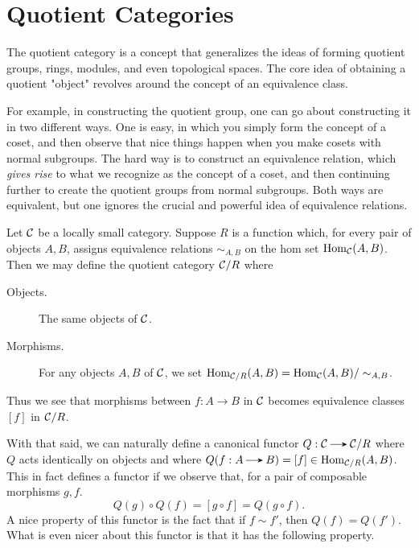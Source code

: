     \newpage
    \section{Quotient Categories}
    The quotient category is a concept that generalizes the ideas of
    forming quotient groups, rings, modules, and even topological
    spaces. The core idea of obtaining a quotient "object" revolves
    around the concept of an equivalence class. 

    For example, in constructing the quotient group, one can go about
    constructing it in two different ways. One is easy, in which you
    simply form the concept of a coset, and then observe that nice
    things happen when you make cosets with normal subgroups. The hard
    way is to construct an equivalence relation, which \textit{gives
    rise} to what we recognize as the concept of a coset, and then
    continuing further to create the quotient groups from normal
    subgroups. Both ways are equivalent, but one ignores the crucial
    and powerful idea of equivalence relations. 

    \begin{definition}
        Let $\mathcal{C}$ be a locally small category. Suppose $R$ is a function which, for every  
        pair of objects $A, B$, assigns equivalence 
        relations $\sim_{A, B}$ on the hom set $\operatorname{\mathrm{Hom}}_{\mathcal{C}}(A, B)$. Then we may define the 
        quotient category $\mathcal{C}/R$ where 
        \begin{description}
            \item[Objects.] The same objects of $\mathcal{C}$.
            \item[Morphisms.] For any objects $A,B$ of $\mathcal{C}$, we 
            set $\operatorname{\mathrm{Hom}}_{\mathcal{C}/R}(A, B) = \operatorname{\mathrm{Hom}}_{\mathcal{C}}(A, B)/\sim_{A, B}$.
        \end{description}
    \end{definition}    
    Thus we see that morphisms between $f: A \to B$ in $\mathcal{C}$ becomes equivalence classes 
    $[f]$ in $\mathcal{C}/R$. 

    With that said, we can naturally define a canonical functor $Q: \cc \to \cc/R$ 
    where $Q$ acts identically on objects and where 
    $Q(f: A \to B) = [f] \in \hom_{\cc/R}(A,B)$. This in fact defines a functor 
    if we observe that, for a pair of composable morphisms $g, f$.
    \[
        Q(g) \circ Q(f) = [g \circ f] = Q(g \circ f). 
    \]
    A nice property of this functor is the fact that if $f \sim f'$, then $Q(f) = Q(f')$.
    What is even nicer about this functor is that it has the following property. 

